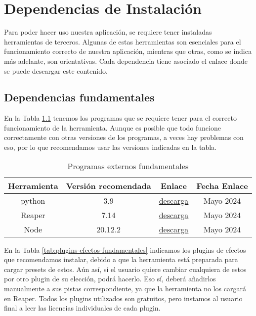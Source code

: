 \chapter{Dependencias de Instalación}
\label{Appendix:Key1}

Para poder hacer uso nuestra aplicación, se requiere tener instaladas herramientas de terceros. Algunas de estas herramientas son esenciales para el funcionamiento correcto de nuestra aplicación, mientras que otras, como se indica más adelante, son orientativas.
Cada dependencia tiene asociado el enlace donde se puede descargar este contenido.

\section{Dependencias fundamentales}

En la Tabla \ref{tab:programas-externos} tenemos los programas que se requiere tener para el correcto funcionamiento de la herramienta. Aunque es posible que todo funcione correctamente con otras versiones de los programas, a veces hay problemas con eso, por lo que recomendamos usar las versiones indicadas en la tabla.

\begin{table}[h]
    \centering
	\begin{tabular}{c|c|c|c}
		\textbf{Herramienta} & \textbf{Versión recomendada} & \textbf{Enlace} & \textbf{Fecha Enlace} \\
		\hline\hline
		python & 3.9 & \href{https://www.python.org/downloads/release/python-390/}{descarga} & Mayo 2024\\
		Reaper & 7.14 & \href{https://www.reaper.fm/download.php}{descarga} & Mayo 2024\\
		Node & 20.12.2 & \href{https://nodejs.org/en/download}{descarga} & Mayo 2024\\
		\hline
	\end{tabular}
	\caption{Programas externos fundamentales}
	\label{tab:programas-externos}
\end{table}

En la Tabla \ref{tab:plugins-efectos-fundamentales} indicamos los plugins de efectos que recomendamos instalar, debido a que la herramienta está preparada para cargar presets de estos. Aún así, si el usuario quiere cambiar cualquiera de estos por otro plugin de su elección, podrá hacerlo. Eso sí, deberá añadirlos manualmente a sus pistas correspondiente, ya que la herramienta no los cargará en Reaper. Todos los plugins utilizados son gratuitos, pero instamos al usuario final a leer las licencias individuales de cada plugin.

